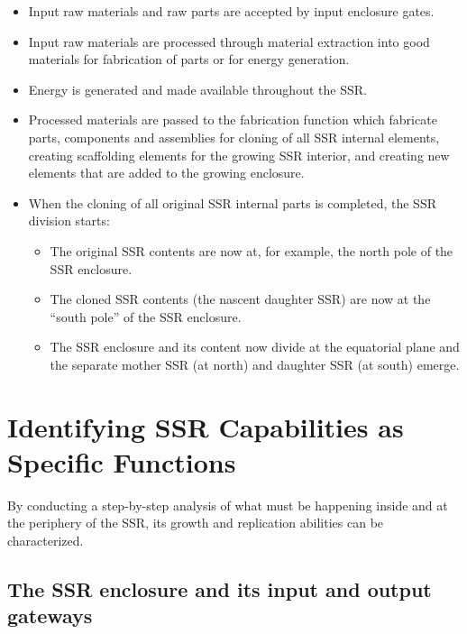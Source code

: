 \begin{itemize}
\item Input raw materials and raw parts are accepted by input enclosure
gates.
\item Input raw materials are processed through material extraction into
good materials for fabrication of parts or for energy generation.
\item Energy is generated and made available throughout the SSR.
\item Processed materials are passed to the fabrication function which fabricate parts, components and
assemblies for cloning of all SSR internal elements, creating scaffolding elements for the growing SSR interior, and creating new elements that are added to the growing enclosure.
\item When the cloning of all original SSR internal parts is completed,
the SSR division starts:

\begin{itemize}
\item The original SSR contents are now at, for example, the north pole
of the SSR enclosure.
\item The cloned SSR contents (the nascent daughter SSR) are now at the
“south pole” of the SSR enclosure.
\item The SSR enclosure and its content now divide at the equatorial
plane and the separate mother SSR (at north) and daughter SSR (at south)
emerge.
\end{itemize}
\end{itemize}

\section{Identifying SSR Capabilities as Specific Functions}

By conducting a step-by-step analysis of what must be happening inside and at
the periphery of the SSR, its growth and replication abilities can be characterized.

\subsection{The SSR enclosure and its input and output gateways}

